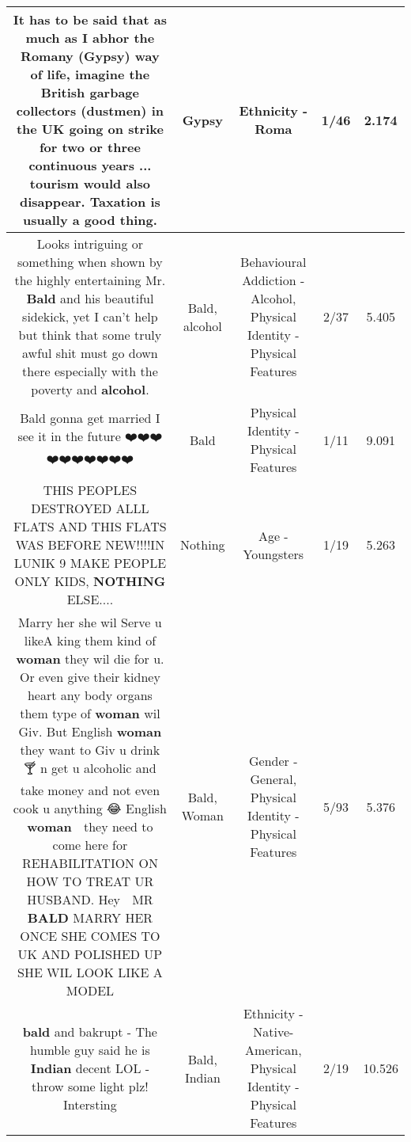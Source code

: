 \documentclass[11pt]{article}
\newlength\mylength
\begin{document}
\begin{center}
\begin{longtable}{|C{.65\mylength}|C{.30\mylength}|C{.12\mylength}|C{.12\mylength}|C{.12\mylength}|}
  \small It has to be said that as much as I abhor the Romany (\textbf{Gypsy}) way of life, imagine the British garbage collectors (dustmen) in the UK going on strike for two or three continuous years ... tourism would also disappear.  Taxation is usually a good thing.\normalsize   & Gypsy & Ethnicity - Roma & 1/46 & 2.174 \\  \hline
  \small Looks intriguing or something when shown by the highly entertaining Mr. \textbf{Bald} and his beautiful sidekick, yet I can't help but think that some truly awful shit must go down there especially with the poverty and \textbf{alcohol}.\normalsize   & Bald, alcohol & Behavioural Addiction - Alcohol, Physical Identity - Physical Features & 2/37 & 5.405 \\  \hline
  \small Bald gonna get married I see it in the future ❤️❤️❤️❤️❤️❤️❤️❤️❤️❤️\normalsize   & Bald & Physical Identity - Physical Features & 1/11 & 9.091 \\  \hline
  \small THIS PEOPLES DESTROYED ALLL FLATS AND THIS FLATS WAS BEFORE NEW!!!!IN LUNIK 9 MAKE PEOPLE ONLY KIDS, \textbf{NOTHING} ELSE....\normalsize   & Nothing & Age - Youngsters & 1/19 & 5.263 \\  \hline
  \small Marry her she wil Serve u likeA king them kind of \textbf{woman} they wil die for u. Or even give their kidney heart any body organs them type of \textbf{woman} wil Giv. But English \textbf{woman} they want to Giv u drink 🍸 n get u alcoholic and take money and not even cook u anything 😂 English \textbf{woman} 👩 they need to come here for REHABILITATION ON HOW TO TREAT UR HUSBAND. Hey 👋 MR \textbf{BALD} MARRY HER ONCE SHE COMES TO UK AND POLISHED UP SHE WIL LOOK LIKE A MODEL\normalsize   & Bald, Woman & Gender - General, Physical Identity - Physical Features & 5/93 & 5.376 \\  \hline
  \small \@\textbf{bald} and bakrupt - The humble guy said he is \textbf{Indian} decent LOL - throw some light plz! Intersting\normalsize   & Bald, Indian & Ethnicity - Native-American, Physical Identity - Physical Features & 2/19 & 10.526 \\  \hline

\end{longtable}
\end{center}
\end{document}
